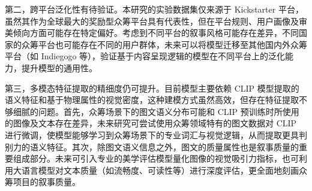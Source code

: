 第二，跨平台泛化性有待验证。本研究的实验数据集仅来源于 Kickstarter 平台，虽然其作为全球最大的奖励型众筹平台具有代表性，但在平台规则、用户画像及审美倾向方面可能存在特定偏好。考虑到不同平台的叙事风格可能存在差异，不同国家的众筹平台也可能存在不同的用户群体，未来可以将模型迁移至其他国内外众筹平台（如 Indiegogo 等），验证基于内容呈现逻辑的模型在不同平台上的泛化能力，提升模型的通用性。

第三，多模态特征提取的精细度仍可提升。目前模型主要依赖 CLIP 模型提取的语义特征和基于物理属性的视觉密度，这种建模方式虽然高效，但存在特征提取不够细腻的问题。首先，众筹场景下的图文语义分布可能和 CLIP 预训练时所使用的图像及文本存在差异，未来研究可尝试使用众筹领域特有的图文数据对 CLIP 进行微调，使模型能够学习到众筹场景下的专业词汇与视觉逻辑，从而提取更具判别力的语义特征。其次，除图文语义信息之外，图文的质量属性也是叙事质量的重要组成部分。未来可引入专业的美学评估模型量化图像的视觉吸引力指标，也可利用大语言模型对文本质量（如流畅度、可读性等）进行深度评估，更全面地刻画众筹项目的叙事质量。

